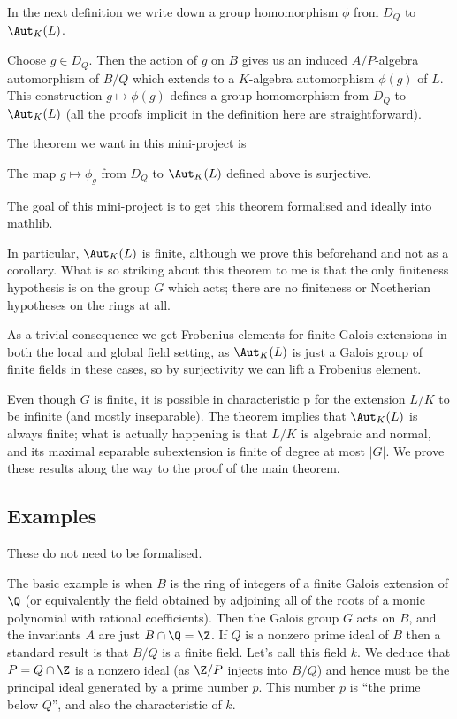 In the next definition we write down a group homomorphism $\phi$ from $D_Q$ to $\Aut_K(L)$.

\begin{definition}
  \label{Bourbaki52222.stabilizer.toGaloisGroup}
  Choose $g\in D_Q$. Then the action of $g$ on $B$ gives us an induced
  $A/P$-algebra automorphism of $B/Q$ which extends to a $K$-algebra automorphism $\phi(g)$ of $L$.
  This construction $g\mapsto \phi(g)$ defines a group homomorphism from $D_Q$
  to $\Aut_K(L)$ (all the proofs implicit in the definition here are straightforward).
  \leanok
\end{definition}

The theorem we want in this mini-project is
\begin{theorem}
  \label{Bourbaki52222.MulAction.stabilizer_surjective_of_action}
  \leanok
  The map $g\mapsto \phi_g$ from $D_Q$ to $\Aut_K(L)$ defined above is surjective.
\end{theorem}

The goal of this mini-project is to get this theorem formalised and ideally into mathlib.

In particular, $\Aut_K(L)$ is finite, although we prove this beforehand and not
as a corollary. What is so striking about this theorem to me is that the only finiteness hypothesis
is on the group $G$ which acts; there are no finiteness or Noetherian
hypotheses on the rings at all.

As a trivial consequence we get Frobenius elements for finite Galois extensions in both
the local and global field setting, as $\Aut_K(L)$ is just a Galois group of finite fields
in these cases, so by surjectivity we can lift a Frobenius element.

Even though $G$ is finite, it is possible in characteristic p for the extension $L/K$ to be
infinite (and mostly inseparable). The theorem implies that $\Aut_K(L)$ is always finite;
what is actually happening is that $L/K$ is algebraic and normal, and its maximal separable
subextension is finite of degree at most $|G|$. We prove these results along the way to the
proof of the main theorem.

\subsection{Examples}

These do not need to be formalised.

The basic example is when $B$ is the ring of integers of a finite Galois extension of $\Q$
(or equivalently the field obtained by adjoining all of the roots of
a monic polynomial with rational coefficients).
Then the Galois group $G$ acts on $B$, and the invariants $A$ are just $B\cap\Q=\Z$. If $Q$
is a nonzero prime ideal of $B$ then a standard result is that $B/Q$ is a finite field. Let's
call this field $k$. We deduce that $P=Q\cap \Z$ is a nonzero ideal (as $\Z/P$ injects into $B/Q$)
and hence must be
the principal ideal generated by a prime number $p$. This number $p$ is ``the prime below $Q$'',
and also the characteristic of $k$.

